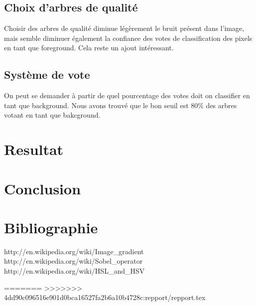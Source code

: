 \documentclass[11pt,a4paper]{report}
\begin{document}
	\subsection{Choix d'arbres de qualité}
	Choisir des arbres de qualité diminue légèrement le bruit présent dans l'image, mais semble diminuer également la confiance des votes
	de classification des pixels en tant que foreground. Cela reste un ajout intéressant. 

	\subsection{Système de vote}
	On peut se demander à partir de quel pourcentage des votes doit on classifier en tant que background. Nous avons trouvé que le bon
	seuil est 80\% des arbres votant en tant que bakcground.
\section{Resultat}

\section{Conclusion}

	
	
\section{Bibliographie}	
\begin{thebibliography}{2}
    http://en.wikipedia.org/wiki/Image\_gradient
    http://en.wikipedia.org/wiki/Sobel\_operator
    http://en.wikipedia.org/wiki/HSL\_and\_HSV  
\end{thebibliography}






=======
>>>>>>> 4dd90c096516e901d0bca16527fa2b6a10b4728c:repport/repport.tex
\end{document}
